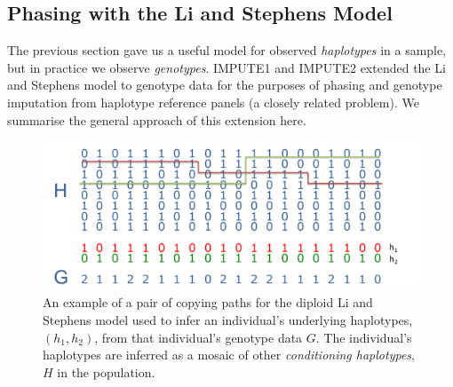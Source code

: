 

\subsection{Phasing with the Li and Stephens Model}
\label{chap3:LSphase}
The previous section gave us a useful model for observed \emph{haplotypes} in a sample, but in practice we observe \emph{genotypes}. IMPUTE1 and IMPUTE2 extended the Li and Stephens model to genotype data for the purposes of phasing and genotype imputation from haplotype reference panels (a closely related problem).  We summarise the general approach of this extension here.


\begin{figure}[h]
  \begin{center} 
    \includegraphics[width=\textwidth]{chap3figs/haplotype_path}
    \caption[Inferring haplotypes with the Li and Stephens Model]{An example of a pair of copying paths for the diploid Li and Stephens model used to infer an individual's underlying haplotypes, $(h_1,h_2)$, from that individual's genotype data $G$.  The individual's haplotypes are inferred as a mosaic of other \emph{conditioning haplotypes}, $H$ in the population.   \label{chap3:happath}}
  \end{center} 
\end{figure}

